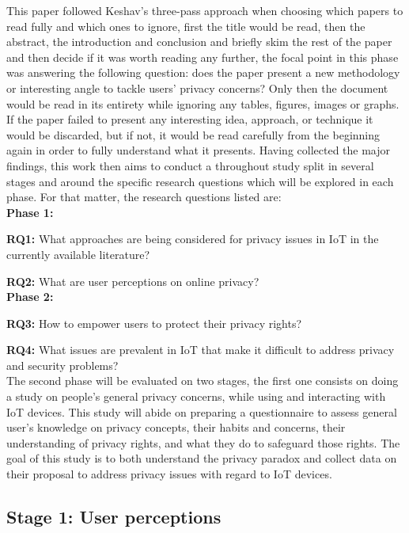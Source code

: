 \documentclass[manuscript,natbib=false]{acmart}
\begin{document}
This paper followed Keshav's three-pass approach \cite{KeshavHow} when choosing
which papers to read fully and which ones to ignore, first the title would
be read, then the abstract, the introduction and conclusion and briefly
skim the rest of the paper and then decide if it was worth reading any further,
the focal point in this phase was answering the following question: does
the paper present a new methodology or interesting angle to tackle users'
privacy concerns? Only then the document would be read in its entirety while
ignoring any tables, figures, images or graphs. If the paper failed to present
any interesting idea, approach, or technique it would be discarded, but
if not, it would be read carefully from the beginning again in order to
fully understand what it presents. Having collected the major findings,
this work then aims to conduct a throughout study split in several stages
and around the specific research questions which will be explored in each
phase. For that matter, the research questions listed are: \\

\textbf{Phase 1:}

\textbf{RQ1:} What approaches are being considered for privacy issues in
IoT in the currently available literature?

\textbf{RQ2:} What are user perceptions on online privacy? \\

\textbf{Phase 2:}

\textbf{RQ3:}
How to empower users to protect their privacy rights?

\textbf{RQ4:} What issues are prevalent in IoT that make it difficult to
address privacy and security problems? \\

The second phase will be evaluated on two stages, the first one consists
on doing a study on people's general privacy concerns, while using and interacting
with IoT devices. This study will abide on preparing a questionnaire to
assess general user's knowledge on privacy concepts, their habits and concerns,
their understanding of privacy rights, and what they do to safeguard those
rights. The goal of this study is to both understand the privacy paradox
and collect data on their proposal to address privacy issues with regard
to IoT devices.

\subsection{Stage 1: User perceptions}
\end{document}
